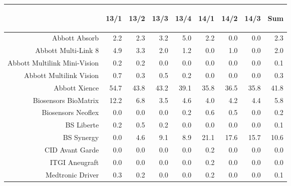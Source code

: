 \documentclass[presentation,xcolor=pdftex,dvipsnames,table]{beamer}
\begin{document}
\begin{frame}
\begin{tiny}
\begin{table}[ht]
\centering
\begin{tabular}{rrrrrrrrr}
  \toprule
 & \begin{sideways} 13/1 \end{sideways} & \begin{sideways} 13/2 \end{sideways} & \begin{sideways} 13/3 \end{sideways} & \begin{sideways} 13/4 \end{sideways} & \begin{sideways} 14/1 \end{sideways} & \begin{sideways} 14/2 \end{sideways} & \begin{sideways} 14/3 \end{sideways} & \begin{sideways} Sum \end{sideways} \\ 
  \midrule
Abbott Absorb & 2.2 & 2.3 & 3.2 & 5.0 & 2.2 & 0.0 & 0.0 & 2.3 \\ 
  Abbott Multi-Link 8 & 4.9 & 3.3 & 2.0 & 1.2 & 0.0 & 1.0 & 0.0 & 2.0 \\ 
  Abbott Multilink Mini-Vision & 0.2 & 0.2 & 0.0 & 0.0 & 0.0 & 0.0 & 0.0 & 0.1 \\ 
  Abbott Multilink Vision & 0.7 & 0.3 & 0.5 & 0.2 & 0.0 & 0.0 & 0.0 & 0.3 \\ 
  Abbott Xience & 54.7 & 43.8 & 43.2 & 39.1 & 35.8 & 36.5 & 35.8 & 41.8 \\ 
  Biosensors BioMatrix & 12.2 & 6.8 & 3.5 & 4.6 & 4.0 & 4.2 & 4.4 & 5.8 \\ 
  Biosensors Neoflex & 0.0 & 0.0 & 0.0 & 0.2 & 0.6 & 0.5 & 0.0 & 0.2 \\ 
  BS Liberte & 0.2 & 0.5 & 0.2 & 0.0 & 0.0 & 0.0 & 0.0 & 0.1 \\ 
  BS Synergy & 0.0 & 4.6 & 9.1 & 8.9 & 21.1 & 17.6 & 15.7 & 10.6 \\ 
  CID Avant Garde & 0.0 & 0.0 & 0.0 & 0.0 & 0.2 & 0.0 & 0.0 & 0.0 \\ 
  ITGI Aneugraft & 0.0 & 0.0 & 0.0 & 0.0 & 0.2 & 0.0 & 0.0 & 0.0 \\ 
  Medtronic Driver & 0.3 & 0.2 & 0.0 & 0.0 & 0.2 & 0.0 & 0.0 & 0.1 \\ 

\end{tabular}
\end{table}
\end{tiny}
\end{frame}
\end{document}
